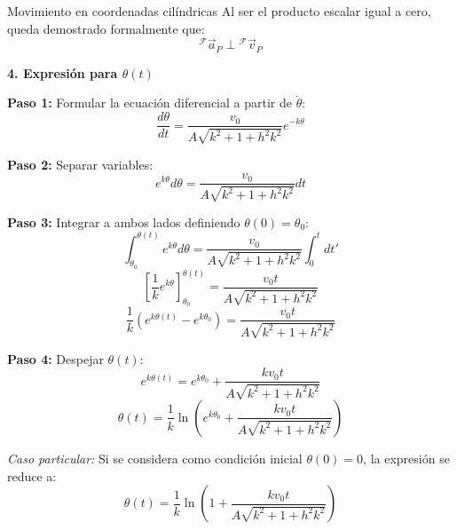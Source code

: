 \begin{solucion}{Movimiento en coordenadas cilíndricas}
Al ser el producto escalar igual a cero, queda demostrado formalmente que:
\[
{}^{\mathcal{F}}\vec{a}_{P} \perp {}^{\mathcal{F}}\vec{v}_{P}
\]

\vspace{0.5cm}

\noindent\textbf{4. Expresión para $\theta(t)$}

\textbf{Paso 1:} Formular la ecuación diferencial a partir de $\dot{\theta}$:
\[
\frac{d\theta}{dt} = \frac{v_0}{A \sqrt{k^2 + 1 + h^2 k^2}} e^{-k\theta}
\]

\textbf{Paso 2:} Separar variables:
\[
e^{k\theta} d\theta = \frac{v_0}{A \sqrt{k^2 + 1 + h^2 k^2}} dt
\]

\textbf{Paso 3:} Integrar a ambos lados definiendo $\theta(0) = \theta_0$:
\[
\int_{\theta_0}^{\theta(t)} e^{k\theta} d\theta = \frac{v_0}{A \sqrt{k^2 + 1 + h^2 k^2}} \int_{0}^{t} dt'
\]
\[
\left[ \frac{1}{k} e^{k\theta} \right]_{\theta_0}^{\theta(t)} = \frac{v_0 t}{A \sqrt{k^2 + 1 + h^2 k^2}}
\]
\[
\frac{1}{k} \left( e^{k\theta(t)} - e^{k\theta_0} \right) = \frac{v_0 t}{A \sqrt{k^2 + 1 + h^2 k^2}}
\]

\textbf{Paso 4:} Despejar $\theta(t)$:
\[
e^{k\theta(t)} = e^{k\theta_0} + \frac{k v_0 t}{A \sqrt{k^2 + 1 + h^2 k^2}}
\]
\[
\theta(t) = \frac{1}{k} \ln \left( e^{k\theta_0} + \frac{k v_0 t}{A \sqrt{k^2 + 1 + h^2 k^2}} \right)
\]

\textit{Caso particular:} Si se considera como condición inicial $\theta(0) = 0$, la expresión se reduce a:
\[
\theta(t) = \frac{1}{k} \ln \left( 1 + \frac{k v_0 t}{A \sqrt{k^2 + 1 + h^2 k^2}} \right)
\]
\end{solucion}
